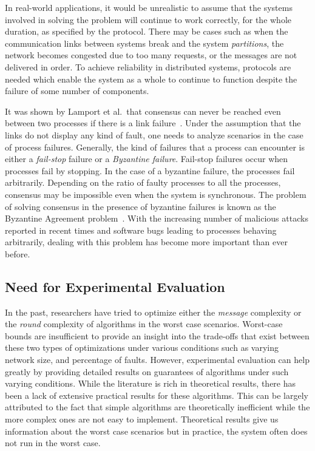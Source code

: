 In real-world applications, it would be unrealistic to assume that the systems
involved in solving the problem will continue to work correctly, for the whole
duration, as specified by the protocol. There may be cases such as when the
communication links between systems break and the system \textit{partitions},
the network becomes congested due to too many requests, or the messages are not
delivered in order. To achieve reliability in distributed systems, protocols
are needed which enable the system as a whole to continue to function despite
the failure of some number of components. 

It was shown by Lamport et al.\ that consensus can never be reached even
between two processes if there is a link failure~\cite{LamportSP82}. Under the
assumption that the links do not display any kind of fault, one needs to
analyze scenarios in the case of process failures. Generally, the kind of
failures that a process can encounter is either a \textit{fail-stop} failure or
a \textit{Byzantine failure}. Fail-stop failures occur when processes fail by
stopping. In the case of a byzantine failure, the processes fail 
arbitrarily. Depending on the ratio of faulty processes to all the processes,
consensus may be impossible even when the system is synchronous. The problem of
solving consensus in the presence of byzantine failures is known as the
Byzantine Agreement problem~\cite{LamportSP82}. With the increasing number of
malicious attacks reported in recent times and software bugs leading to
processes behaving arbitrarily, dealing with this problem has become more
important than ever before.

\subsection{Need for Experimental Evaluation}

In the past, researchers have tried to optimize either the \textit{message}
complexity or the \textit{round} complexity of algorithms in the worst case
scenarios. Worst-case bounds are insufficient to provide an insight into the
trade-offs that exist between these two types of optimizations under various
conditions such as varying network size, and percentage of faults. However,
experimental evaluation can help greatly by providing detailed results on
guarantees of algorithms under such varying conditions.  While the literature
is rich in theoretical results, there has been a lack of extensive practical
results for these algorithms. This can be largely attributed to the fact that
simple algorithms are theoretically inefficient while the more complex ones are
not easy to implement. Theoretical results give us information about the worst
case scenarios but in practice, the system often does not run in the worst
case. 

